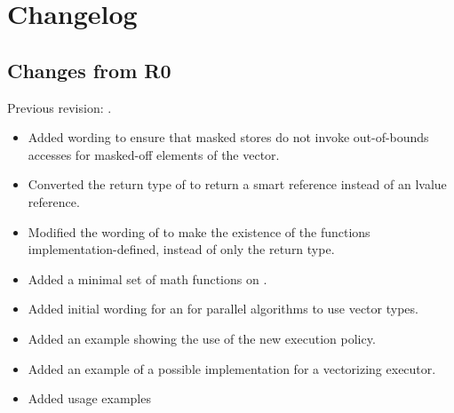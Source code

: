 \section{Changelog}
\subsection{Changes from R0}
Previous revision: \citep{P0214R0}.
\begin{itemize}
  \chck Extended the  tag types with a  tag to handle arbitrarily sized vectors (\ref{sec:datapar.abi}).
  \chck Converted  into a non-member trait (\ref{sec:datapar.traits}).
  \chck Extended implicit conversions to handle \fixedsizeN (\ref{sec:datapar.ctor}).
  \chck Extended binary operators to convert correctly with \fixedsizeN (\ref{sec:datapar.binary}).
  \chck Dropped the section on “\datapar logical operators”. Added a note that the omission is deliberate (\ref{sec:datapar.logical}).
  \chck Added logical and bitwise operators to \mask (\ref{sec:mask.binary}).
  \chck Modified \mask compares to work better with implicit conversions (\ref{sec:mask.comparison}).
  \chck Modified  to support different Abi tags on the \mask and \datapar arguments (\ref{sec:mask.where}).
  \chck Converted the load functions to non-member functions.
    SG1 asked for guidance from LEWG whether a load-expression or a template parameter to load is more appropriate.
  \chck Converted the store functions to non-member functions to be consistent with the load functions.
  \item Added wording to ensure that masked stores do not invoke out-of-bounds accesses for masked-off elements of the vector.
  \item Converted the return type of \datapar{} to return a smart reference instead of an lvalue reference.
  \item Modified the wording of  to make the existence of the functions implementation-defined, instead of only the return type.
  \item Added a minimal set of math functions on \datapar.
  \item Added initial wording for an  for parallel algorithms to use vector types.
  \item Added an example showing the use of the new execution policy.
  \item Added an example of a possible  implementation for a vectorizing executor.
  \item Added usage examples
\end{itemize}





